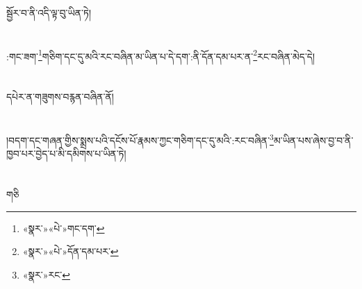 སྦྱོར་བ་ནི་འདི་ལྟ་བུ་ཡིན་ཏེ།\chapter{ }:གང་ཟག་\footnote{«སྣར་»«པེ་»གང་དག་}གཅིག་དང་དུ་མའི་རང་བཞིན་མ་ཡིན་པ་དེ་དག་:ནི་དོན་དམ་པར་ན་\footnote{«སྣར་»«པེ་»དོན་དམ་པར་}རང་བཞིན་མེད་དེ།\chapter{ }དཔེར་ན་གཟུགས་བརྙན་བཞིན་ནོ།\chapter{ }།བདག་དང་གཞན་གྱིས་སྨྲས་པའི་དངོས་པོ་རྣམས་ཀྱང་གཅིག་དང་དུ་མའི་:རང་བཞིན་\footnote{«སྣར་»རང་}མ་ཡིན་པས་ཞེས་བྱ་བ་ནི་ཁྱབ་པར་བྱེད་པ་མི་དམིགས་པ་ཡིན་ཏེ།\chapter{ }གཅི